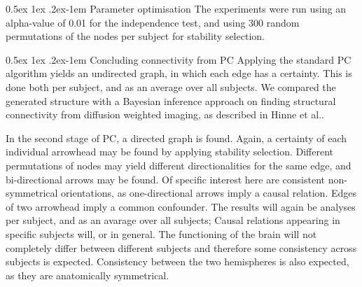 \documentclass[a4paper, 10pt, english, onecolumn]{article}
\makeatletter
\renewcommand{\paragraph}{%
  \@startsection{paragraph}{4}%
  {\z@}{0.5ex \@plus 1ex \@minus .2ex}{-1em}%
  {\normalfont\normalsize\bfseries}%
}
\makeatother
\begin{document}
\paragraph{Parameter optimisation}
The experiments were run using an alpha-value of 0.01 for the independence test, and using 300 random permutations of the nodes per subject for stability selection.

\paragraph{Concluding connectivity from PC}
Applying the standard PC algorithm yields an undirected graph, in which each edge has a certainty.
This is done both per subject, and as an average over all subjects.
We compared the generated structure with a Bayesian inference approach on finding structural connectivity from diffusion weighted imaging, as described in Hinne et al.\cite{hinne2013}.

In the second stage of PC, a directed graph is found.
Again, a certainty of each individual arrowhead may be found by applying stability selection.
Different permutations of nodes may yield different directionalities for the same edge, and bi-directional arrows may be found.
Of specific interest here are consistent non-symmetrical orientations, as one-directional arrows imply a causal relation.
Edges of two arrowhead imply a common confounder.
The results will again be analyses per subject, and as an avarage over all subjects; Causal relations appearing in specific subjects will, or in general.
The functioning of the brain will not completely differ between different subjects and therefore some consistency across subjects is expected.
Consistency between the two hemispheres is also expected, as they are anatomically symmetrical.

\end{document}

